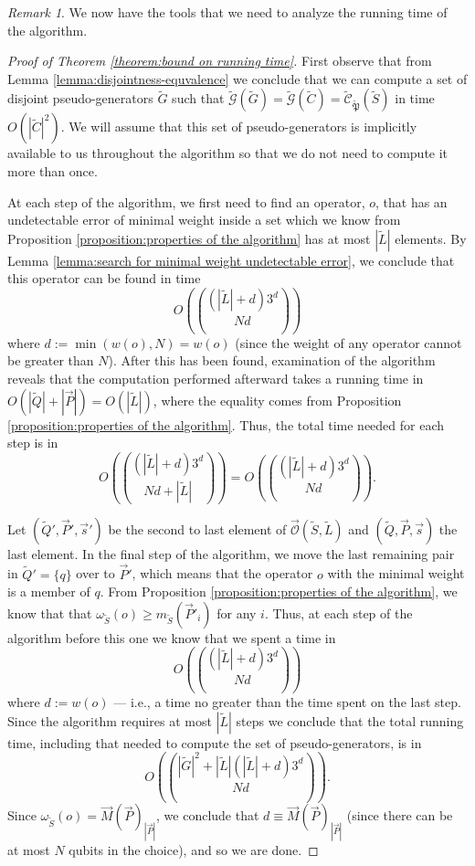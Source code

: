 \documentclass[12pt]{amsbook}
\theoremstyle{plain}
\theoremstyle{definition}
\theoremstyle{remark}
\newtheorem{remark}{Remark}
\newcommand{\lst}{\vec}
\newcommand{\set}{\tilde}
\newcommand{\genfun}{\tilde{\mathcal{G}}}
\newcommand{\pauligroup}{{\set{\mathfrak{P}}}}
\newcommand{\centralizer}{\set{\mathcal{C}}}
\newcommand{\optimizer}{\lst{\mathcal{O}}}
\newcommand{\om}{\omega}
\newcommand{\paren}[1]{\left(#1\right)}
\begin{document}
\begin{remark}
We now have the tools that we need to analyze the running time of the algorithm.
\end{remark}

\begin{proof}[Proof of Theorem \ref{theorem:bound on running time}]
First observe that from Lemma \ref{lemma:disjointness-equvalence} we conclude that we can compute a set of disjoint pseudo-generators $\set G$ such that $\genfun(\set G)=\genfun(\set C)=\centralizer_\pauligroup(\set S)$ in time $O(|\set C|^2)$.  We will assume that this set of pseudo-generators is implicitly available to us throughout the algorithm so that we do not need to compute it more than once.

At each step of the algorithm, we first need to find an operator, $o$, that has an undetectable error of minimal weight inside a set which we know from Proposition \ref {proposition:properties of the algorithm} has at most $|\set L|$ elements.  By Lemma \ref{lemma:search for minimal weight undetectable error}, we conclude that this operator can be found in time $$O\paren{(|\set L|+d)3^d\choose{N}{d}}$$ where $d:=\min\paren{w(o),N}=w(o)$ (since the weight of any operator cannot be greater than $N$).  After this has been found, examination of the algorithm reveals that the computation performed afterward takes a running time in $O(|\set Q|+|\lst P|)=O(|\set L|)$, where the equality comes from Proposition \ref {proposition:properties of the algorithm}.  Thus, the total time needed for each step is in $$O\paren{(|\set L|+d)3^d\choose{N}{d}+|\set L|}=O\paren{(|\set L|+d)3^d\choose{N}{d}}.$$

Let $(\set Q',\lst P',\lst s')$ be the second to last element of $\optimizer(\set S,\set L)$ and $(\set Q,\lst P,\lst s)$ the last element.  In the final step of the algorithm, we move the last remaining pair in $\set Q'=\{q\}$ over to $\lst P'$, which means that the operator $o$ with the minimal weight is a member of $q$.  From Proposition \ref {proposition:properties of the algorithm}, we know that that $\om_{\set S}(o)\ge m_{\set S}(\lst P'_i)$ for any $i$.  Thus, at each step of the algorithm before this one we know that we spent a time in $$O\paren{(|\set L|+d)3^d\choose{N}{d}}$$ where $d:=w(o)$ --- i.e., a time no greater than the time spent on the last step.  Since the algorithm requires at most $|\set L|$ steps we conclude that the total running time, including that needed to compute the set of pseudo-generators, is in $$O\paren{|\set G|^2+|\set L|(|\set L|+d)3^d\choose{N}{d}}.$$  Since $\om_{\set S}(o)=\lst M(\lst P)_{|\lst P|}$, we conclude that $d\equiv\lst M(\lst P)_{|\lst P|}$ (since there can be at most $N$ qubits in the choice), and so we are done.
\end{proof}
\end{document}
